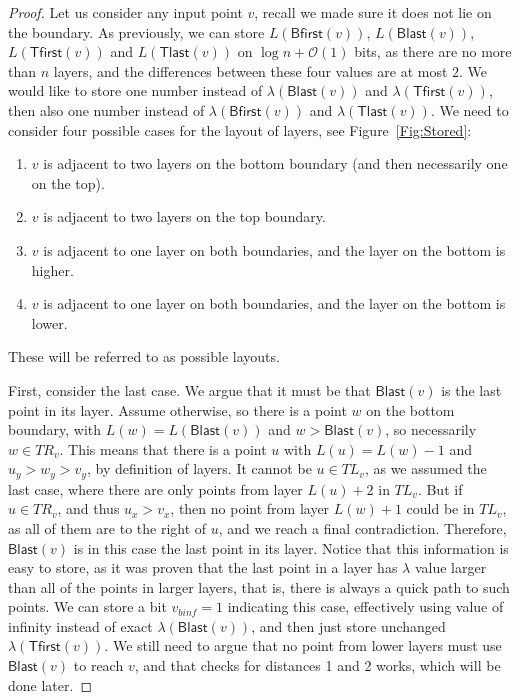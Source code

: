 \documentclass[a4paper,11pt]{article}
\newcommand{\Oh}{\mathcal{O}}
\newcommand{\lam}{\lambda}
\newcommand{\Blast}{\mathsf{Blast}}
\newcommand{\Bfirst}{\mathsf{Bfirst}}
\newcommand{\Tlast}{\mathsf{Tlast}}
\newcommand{\Tfirst}{\mathsf{Tfirst}}
\begin{document}
\begin{proof}
Let us consider any input point $v$, recall we made sure it does not lie on the boundary.
As previously, we can store $L(\Bfirst(v))$, $L(\Blast(v))$, $L(\Tfirst(v))$ and $L(\Tlast(v))$ on $\log{n}+\Oh(1)$ bits,
as there are no more than $n$ layers, and the differences between these four values are at most $2$.
We would like to store one number instead of $\lam(\Blast(v))$ and $\lam(\Tfirst(v))$, then also one number instead of
$\lam(\Bfirst(v))$ and $\lam(\Tlast(v))$.
We need to consider four possible cases for the layout of layers, see Figure~\ref{Fig:Stored}:
\begin{enumerate}
\item $v$ is adjacent to two layers on the bottom boundary (and then necessarily one on the top).
\item $v$ is adjacent to two layers on the top boundary.
\item $v$ is adjacent to one layer on both boundaries, and the layer on the bottom is higher.
\item $v$ is adjacent to one layer on both boundaries, and the layer on the bottom is lower.
\end{enumerate}
These will be referred to as possible layouts.

First, consider the last case.
We argue that it must be that $\Blast(v)$ is the last point in its layer.
Assume otherwise, so there is a point $w$ on the bottom boundary, with $L(w)=L(\Blast(v))$ and $w>\Blast(v)$,
so necessarily $w \in TR_v$.
This means that there is a point $u$ with $L(u)=L(w)-1$ and $u_y>w_y>v_y$, by definition of layers.
It cannot be $u \in TL_v$, as we assumed the last case, where there are only points from layer $L(u)+2$ in $TL_v$.
But if $u \in TR_v$, and thus $u_x>v_x$, then no point from layer $L(w)+1$ could be in $TL_v$,
as all of them are to the right of $u$, and we reach a final contradiction.
Therefore, $\Blast(v)$ is in this case the last point in its layer.
Notice that this information is easy to store, as it was proven that the last point in a layer has $\lam$ value larger than
all of the points in larger layers, that is, there is always a quick path to such points.
We can store a bit $v_{binf}=1$ indicating this case, effectively using value of infinity instead of exact $\lam(\Blast(v))$,
and then just store unchanged $\lam(\Tfirst(v))$.
We still need to argue that no point from lower layers must use $\Blast(v)$ to reach $v$, and that
checks for distances 1 and 2 works, which will be done later.


\end{proof}
\end{document}

